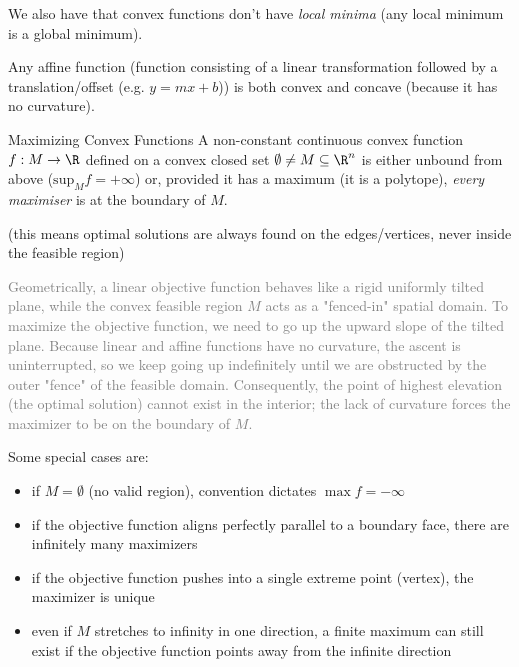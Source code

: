 \documentclass[a4paper, 11pt]{report}
\newcommand{\Rn}{\R^{n}}
\begin{document}
We also have that convex functions don't have \textit{local minima} (any local minimum is a global minimum).

\begin{gframe}{}
Any affine function (function consisting of a linear transformation followed by a translation/offset (e.g. $y = mx + b$)) is  both convex and concave (because it has no curvature).
\end{gframe}

\begin{thmframe}{Maximizing Convex Functions}{}
    \label{thm:solutions-on-edges}
    A non-constant continuous convex function $f: M \to \R$ defined on a convex closed set $\emptyset \neq M \subseteq \Rn$ is either unbound from above ($\text{sup}_{M}f = + \infty$) or, provided it has a maximum (it is a polytope), \textit{every maximiser} is at the boundary of $M$.

    (this means optimal solutions are always found on the edges/vertices, never inside the feasible region)
\end{thmframe}

    \textcolor{gray}{Geometrically, a linear objective function behaves like a rigid uniformly tilted plane, while the convex feasible region $M$ acts as a "fenced-in" spatial domain. To maximize the objective function, we need to go up the upward slope of the tilted plane. Because linear and affine functions have no curvature, the ascent is uninterrupted, so we keep going up indefinitely until we are obstructed by the outer "fence" of the feasible domain. Consequently, the point of highest elevation (the optimal solution) cannot exist in the interior; the lack of curvature forces the maximizer to be on the boundary of $M$.}

    Some special cases are:
    \begin{itemize}
        \item if $M = \emptyset$ (no valid region), convention dictates $\max f = -\infty$
        \item if the objective function aligns perfectly parallel to a boundary face, there are infinitely many maximizers
        \item if the objective function pushes into a single extreme point (vertex), the maximizer is unique
        \item even if $M$ stretches to infinity in one direction, a finite maximum can still exist if the objective function points away from the infinite direction
    \end{itemize}
\end{document}
